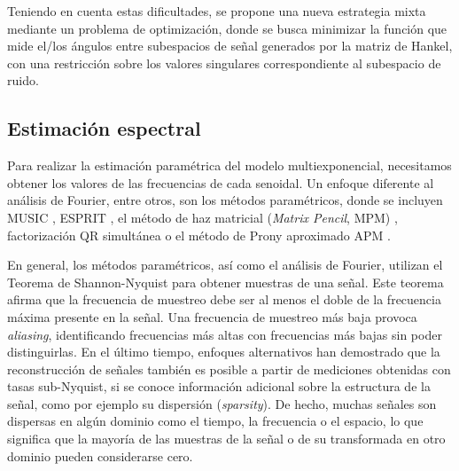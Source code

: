Teniendo en cuenta estas dificultades, se propone una nueva estrategia mixta mediante un problema de optimización, donde se busca minimizar la función que mide el/los ángulos entre subespacios de señal generados por la matriz de Hankel, con una restricción sobre los valores singulares correspondiente al subespacio de ruido. %

\subsection{Estimación espectral}

Para realizar la estimación paramétrica del modelo multiexponencial, necesitamos obtener los valores de las frecuencias de cada senoidal.  Un enfoque diferente al análisis de Fourier, entre otros, son los métodos paramétricos, donde se incluyen MUSIC \cite{Schmidt1986}, ESPRIT \cite{Roy1989}, el método de haz matricial (\emph{Matrix Pencil}, MPM) \cite{Hua1990}, factorización QR simultánea  \cite{Golub1999} o el método de Prony aproximado APM \cite{Potts2010}.

En general, los métodos paramétricos, así como el análisis de Fourier, utilizan el Teorema de Shannon-Nyquist \cite{Nyquist1928, Shannon1949} para obtener muestras de una señal. Este teorema afirma que la frecuencia de muestreo debe ser al menos el doble de la frecuencia máxima presente en la señal. Una frecuencia de muestreo más baja provoca \emph{aliasing}, identificando frecuencias más altas con frecuencias más bajas sin poder distinguirlas. En el último tiempo, enfoques alternativos han demostrado que la reconstrucción de señales también es posible a partir de mediciones obtenidas con tasas sub-Nyquist, si se conoce información adicional sobre la estructura de la señal, como por ejemplo su dispersión (\emph{sparsity}). De hecho, muchas señales son dispersas en algún dominio como el tiempo, la frecuencia o el espacio, lo que significa que la mayoría de las muestras de la señal o de su transformada en otro dominio pueden considerarse cero. 

